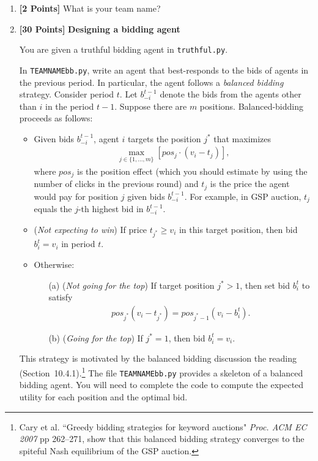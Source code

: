 \documentclass[11pt]{article}
\newcommand{\points}[1]{\textbf{[#1 Points]}}
\begin{document}
	\begin{enumerate}
\item\points{2} What is your team name?
		\item\points{30} {\bf Designing a bidding agent}

You are given a truthful bidding agent in \verb+truthful.py+.

In
\verb+TEAMNAMEbb.py+, write an agent that best-responds to the
bids of agents in the previous period. In particular, the agent follows
a {\em balanced bidding} strategy.  Consider period $t$. 
Let $b_{-i}^{t-1}$ denote the bids from the 
agents other than $i$ in the  period $t-1$.
Suppose there are $m$ positions. Balanced-bidding
proceeds as follows:
%
\begin{itemize}
\item Given bids $b_{-i}^{t-1}$, agent $i$
targets the position $j^\ast$ that maximizes
%
\begin{align}
\max_{j\in\{1,\ldots,m\}} [pos_j\cdot (v_i - t_j)],
\end{align}
%
where $pos_j$ is the position effect (which you should estimate by using the number of clicks in the previous round)  and $t_j$ is the price the agent would pay
for position $j$ given bids $b^{t-1}_{-i}$. For example, in GSP auction, $t_j$
equals the $j$-th highest bid in $b_{-i}^{t-1}$.

%
\item ({\em Not expecting to win}) 
If price $t_{j^\ast}\geq v_i$ in this target position,
then bid $b^t_i=v_i$ in period $t$.
%
		\item Otherwise:
%
\begin{itemize}
\item[(a)] ({\em Not going for the top}) If target position $j^\ast>1$,
then set  bid $b^t_i$ to satisfy
%
\begin{align}
pos_{j^\ast}(v_i - t_{j^\ast}) = pos_{j^\ast-1}(v_i - b^t_i).
\end{align}
%
%
\item[(b)] ({\em Going for the top}) If $j^\ast=1$, 
then bid
$b^t_i=v_i$.
\end{itemize}
	\end{itemize}

        This strategy is motivated by the balanced bidding discussion
        the reading (Section~10.4.1).\footnote{Cary et al.  ``Greedy
          bidding strategies for keyword auctions" {\em Proc.  ACM EC
            2007} pp 262--271, show that this balanced bidding
          strategy converges to the spiteful Nash equilibrium of the
          GSP auction.}
%
	The file \verb+TEAMNAMEbb.py+ provides a skeleton of a
        balanced bidding agent. You will need to complete
the code to compute the  expected
        utility for each position and the optimal bid.
        

\end{enumerate}
\end{document}
